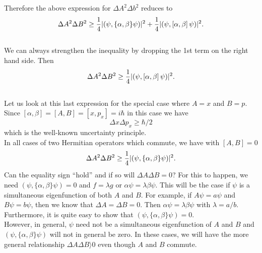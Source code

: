     Therefore the above expression for $\Delta A^2\Delta b^2$ reduces to 
   $$ \Delta A^2 \Delta B^2 \ge {1\over 4} |(\psi,\{ \alpha, \beta\}\psi)|^2 + {1\over4}|(\psi, \left[ \alpha,\beta\right]\psi)|^2.$$\\
   We can always strengthen the inequality by dropping the 1st term on the right hand side. Then
   $$\Delta A^2 \Delta B^2 \ge {1\over 4} |(\psi, \left[ \alpha,\beta\right]\psi)|^2.$$\\
   Let us look at this last expression for the special case where $A=x$ and $B=p$.\\
   Since $\left[\alpha,\beta\right] = \left[A,B\right] = \left[x,p_x\right] = i\hbar$ in this case we have
   $$\Delta x\Delta p_x \ge \hbar/2$$ which is the well-known uncertainty principle. \\
   In all cases of two Hermitian operators which commute, we have with $\left[A,B\right] = 0$ 
   $$\Delta A^2 \Delta B^2 \ge {1\over4}| (\psi,\{\alpha,\beta\}\psi)|^2.$$
   Can the equality sign ``hold'' and if so will $\Delta A\Delta B = 0$? For this to happen, we need $(\psi,\{\alpha,\beta\}\psi) = 0$ and $f = \lambda g$ or $\alpha \psi = \lambda \beta \psi$. This will be the case if
   $\psi$ is  a simultaneous eigenfunction of both $A$ and $B$. For example, if $A\psi = a\psi$ and $B\psi =b\psi$, then we know that $\Delta A = \Delta B = 0$. Then $\alpha \psi = \lambda\beta\psi$ with
   $\lambda = a/b$. Furthermore, it is quite easy to show that $(\psi,\{\alpha,\beta\}\psi) = 0$. \\
   However, in general, $\psi$ need not be a simultaneous eigenfunction of $A$ and $B$ and $(\psi,\{\alpha,\beta\}\psi)$ will not in general be zero. In these cases, we will have the more general 
   relationship $\Delta A\Delta B \rangle  0$ even though $A$  and $B$ commute. \\
   
